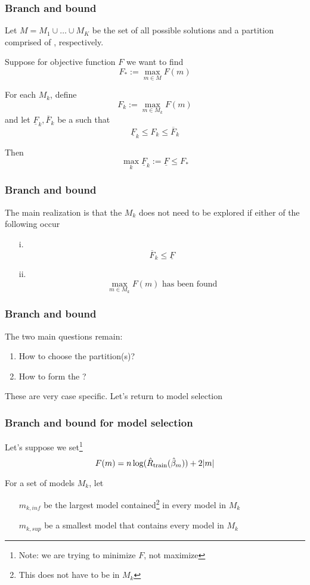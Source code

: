 \documentclass{beamer}
\begin{document}
\begin{frame}[fragile]
\frametitle{Branch and bound}
Let $M = M_1\cup \ldots \cup M_K$ be the set of all possible solutions and a partition comprised of , respectively.  



\vsp
Suppose for objective function $F$ we want to find
\[
F_* :=  \max_{m \in M} F(m)
\]

\vsp
For each $M_k$, define
\[
F_k := \max_{m \in M_k} F(m) 
\]
and let $\underline{F}_k, \overline{F}_k $ be a  such that
\[
 \underline{F}_k \leq F_k \leq \overline{F}_k 
\]
\vsp

Then
\[
\max_k \underline{F}_k := \underline{F} \leq F_* %
\]
\end{frame}

\begin{frame}[fragile]
\frametitle{Branch and bound}
The main realization is that the  $M_k$ does not need to be explored if
either of the following occur
\begin{itemize}
\item[i.] 
\[
\overline{F}_k \leq \underline{F}
\]
\item[ii.] 
\[
\max_{m \in M_k} F(m) \textrm{ has been found}
\]
\end{itemize}
\vfill

\end{frame}

\begin{frame}[fragile]
\frametitle{Branch and bound}
The two main questions remain:
\begin{enumerate}
\item How to choose the partition(s)?
\item How to form the ?

\end{enumerate}

\vvsp
These are very case specific.  Let's return to model selection
\end{frame}

\begin{frame}[fragile]
\frametitle{Branch and bound for model selection}
Let's suppose we set\footnote{Note: we are trying to minimize $F$, not maximize}
\[
F(m) = n \log(\hat{R}_{\textrm{train}}(\hat\beta_m)) + 2|m| 
\]

For a set of models $M_k$, let
\begin{itemize}
\item[] $m_{k,inf}$ be the largest model contained\footnote{This does not have to be in $M_k$}
 in every model in $M_k$
\item[] $m_{k,sup}$ be a smallest model that contains every model in $M_k$
\end{itemize}

\end{frame}
\end{document}
